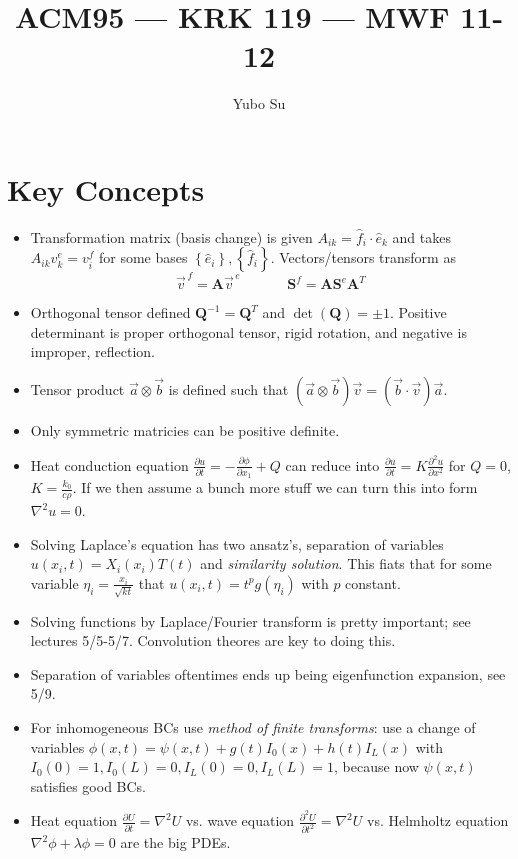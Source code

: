 \documentclass[10pt]{report}
\newcommand{\ptd}[2]{\frac{\partial^2 #1}{\partial#2^2}}
\newcommand{\pd}[2]{\frac{\partial #1}{\partial#2}}
\begin{document}
\pagestyle{fancy}
\title{ACM95 --- KRK 119 --- MWF 11-12}
\author{Yubo Su}
\date{ }

\maketitle

\tableofcontents
\newpage

\chapter{Key Concepts}

\begin{itemize}
    \item Transformation matrix (basis change) is given $A_{ik} = \hat{f}_i\cdot \hat{e}_k$ and takes $A_{ik}v_k^e = v_i^f$ for some bases $\left\{ \hat{e}_i  \right\}, \left\{ \hat{f}_i  \right\}$. Vectors/tensors transform as
        $$\vec{v}^{\,f} = \mathbf{A}\vec{v}^{\,e}\;\;\;\;\;\;\;\;\;\;\;\; \mathbf{S}^f = \mathbf{A}\mathbf{S}^e\mathbf{A}^T$$
    \item Orthogonal tensor defined $\mathbf{Q}^{-1} = \mathbf{Q}^T$ and $\det(\mathbf{Q}) = \pm 1$. Positive determinant is proper orthogonal tensor, rigid rotation, and negative is improper, reflection. 
    \item Tensor product $\vec{a} \otimes \vec{b}$ is defined such that $(\vec{a}\otimes \vec{b})\vec{v} = (\vec{b}\cdot \vec{v})\vec{a}$.
    \item Only symmetric matricies can be positive definite.
    \item Heat conduction equation $\pd{u}{t} = -\pd{\phi}{x_1} + Q$ can reduce into $\pd{u}{t} = K \ptd{u}{x}$ for $Q = 0$, $K = \frac{k_0}{c\rho}$. If we then assume a bunch more stuff we can turn this into form $\nabla^2 u = 0$.
    \item Solving Laplace's equation has two ansatz's, separation of variables $u(x_i,t) = X_i(x_i)T(t)$ and \emph{similarity solution}. This fiats that for some variable $\eta_i = \frac{x_i}{\sqrt{kt}}$ that $u(x_i,t) = t^pg(\eta_i)$ with $p$ constant.
    \item Solving functions by Laplace/Fourier transform is pretty important; see lectures 5/5-5/7. Convolution theores are key to doing this.
    \item Separation of variables oftentimes ends up being eigenfunction expansion, see 5/9.
    \item For inhomogeneous BCs use \emph{method of finite transforms}: use a change of variables $\phi(x,t) = \psi(x,t) + g(t) I_0(x) + h(t)I_L(x)$ with $I_0(0) = 1, I_0(L) = 0, I_L(0) = 0, I_L(L) = 1$, because now $\psi(x,t)$ satisfies good BCs.
    \item Heat equation $\pd{U}{t} = \nabla^2 U$ vs. wave equation $\ptd{U}{t} = \nabla^2 U$ vs. Helmholtz equation $\nabla^2 \phi + \lambda \phi =0$ are the big PDEs. 
\end{itemize}
\end{document}
